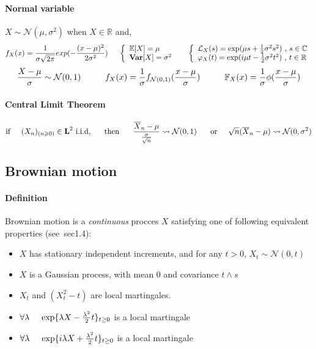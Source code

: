 \documentclass[a4paper,10pt]{article}
\begin{document}
\paragraph{Normal variable} $X \sim \mathcal{N}(\mu,\sigma^2)$ when $X \in \mathbb{R}$ and,
\[
f_{X}(x) = \frac{1}{\sigma \sqrt{2\pi}} exp (-\frac{(x-\mu)^2}{2\sigma^2})
\hspace{5mm}
\left\{
\begin{array}{l}
\mathbb{E}[X]=\mu \\
\textbf{Var}[X]=\sigma^2
\end{array}\right.
\hspace{5mm}
\left\{
\begin{array}{l}
\mathcal{L}_{X}(s) =  \text{exp}(\mu s  + \frac{1}{2} \sigma^2 s^2) \hbox{ , } s\in\mathbb{C} \\
\varphi_{X}(t)     =  \text{exp}(i\mu t - \frac{1}{2} \sigma^2 t^2) \hbox{ , } t\in\mathbb{R}
\end{array}\right.
\]
\[
\frac{X - \mu}{\sigma} \sim \mathcal{N}(0,1)
\hspace{10mm}
f_{X}(x) = \frac{1}{\sigma}f_{\mathcal{N}(0,1)}(\frac{x-\mu}{\sigma})
\hspace{10mm}
\mathbb{F}_{X}(x) = \frac{1}{\sigma}\phi(\frac{x-\mu}{\sigma})
\]
\paragraph{Central Limit Theorem}
\[
\text{if} \hspace{5mm} (X_{n})_{(n\geqslant 0)} \in \textbf{L}^2 \text{  i.i.d,} \hspace{5mm} \text{ then  } \hspace{5mm}
\frac{\overline{X}_n - \mu}{\frac{\sigma}{\sqrt{n}}} \rightsquigarrow   \mathcal{N}(0,1)
 \hspace{5mm}  \text{    or} \hspace{5mm}  
\sqrt{n}(\overline{X}_n - \mu) \rightsquigarrow   \mathcal{N}(0,\sigma^{2})
\]
\subsection{Brownian motion} 
\paragraph{Definition} Brownian motion is a \textit{continuous} procces $X$ satisfying one of following equivalent properties  (see~\cite{MONIQUE}sec1.4):
\begin{itemize}
 \item $X$ has stationary independent increments, and for any $t>0$, $X_t \sim \mathcal{N}(0,t)$
 \item $X$ is a Gaussian process, with mean 0 and covariance $t\wedge s$
 \item $X_t$ and $(X_t^2 - t)$ are local martingales.
 \item $\forall \lambda \hspace{0.5cm} \text{exp}\{  \lambda X - \frac{\lambda^2}{2}t \}_{t\geq0}$ is a local martingale
 \item $\forall \lambda \hspace{0.5cm} \text{exp}\{ i\lambda X + \frac{\lambda^2}{2}t \}_{t\geq0}$ is a local martingale
\end{itemize}
\end{document}
